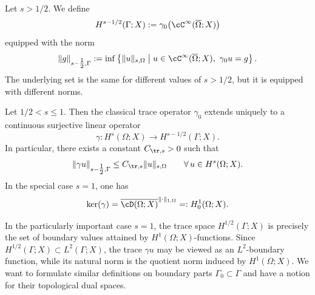 \begin{definition}\label{def:boundary_sobolev}
	Let $s>1/2$. We define
	\begin{equation*}
		H^{s-1/2}(\Gamma;X):=\gamma_0\big(\cC^\infty(\overline{\Omega};X)\big)
	\end{equation*}
	equipped with the norm
	\begin{equation*}
		\|g\|_{s-\tfrac12,\Gamma}
		:=
		\inf\left\{
		\|u\|_{s,\Omega}
		\;\middle|\;
		u\in \cC^\infty(\overline{\Omega};X),\ \gamma_0 u=g
		\right\}.
	\end{equation*}
	The underlying set is the same for different values of $s>1/2$, but it is equipped with different norms.
\end{definition}
\begin{theorem}\label{thm:trace}
	Let $1/2< s\le 1$. Then the classical trace operator $\gamma_0$ extends uniquely to a continuous surjective linear operator
	\begin{equation*}
		\gamma:H^s(\Omega;X)\to H^{s-1/2}(\Gamma;X).
	\end{equation*}
	In particular, there exists a constant $C_{\tr,s}>0$ such that
	\begin{equation*}
		\|\gamma u\|_{s-\tfrac12,\Gamma}\le C_{\tr,s}\|u\|_{s,\Omega}
		\qquad\forall\,u\in H^s(\Omega;X).
	\end{equation*}
	In the special case $s=1$, one has
	\begin{equation*}
		\ker(\gamma)=\overline{\cD(\Omega;X)}^{\|\cdot\|_{1,\Omega}}=:H_0^1(\Omega;X).
	\end{equation*}
\end{theorem}
In the particularly important case $s=1$, the trace space $H^{1/2}(\Gamma;X)$ is precisely the set of boundary values attained by $H^1(\Omega;X)$-functions. Since $H^{1/2}(\Gamma;X)\subset L^2(\Gamma;X)$, the trace $\gamma u$ may be viewed as an $L^2$-boundary function, while its natural norm is the quotient norm induced by $H^1(\Omega;X)$.  We want to formulate similar definitions on boundary parts $\Gamma_0\subset\Gamma$ and have a notion for their topological dual spaces.

